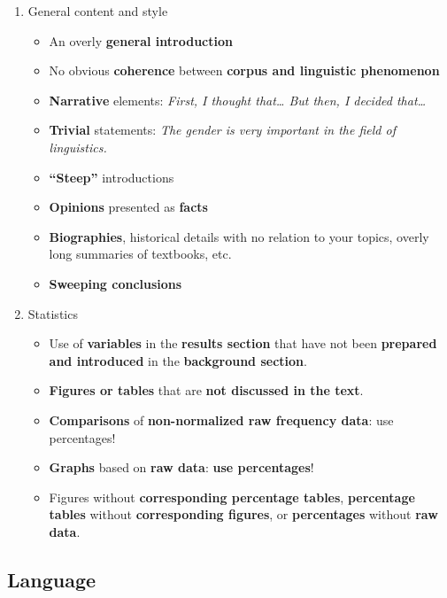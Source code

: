 \documentclass[
  11pt,
  letterpaper,
  DIV=11,
  numbers=noendperiod]{scrreprt}
\providecommand{\tightlist}{%
  \setlength{\itemsep}{0pt}\setlength{\parskip}{0pt}}\usepackage{longtable,booktabs,array}
\begin{document}
\begin{enumerate}
\def\labelenumi{\arabic{enumi}.}
\tightlist
\item
  General content and style

  \begin{itemize}
  \tightlist
  \item
    An overly \textbf{general introduction}
  \item
    No obvious \textbf{coherence} between \textbf{corpus and linguistic
    phenomenon}
  \item
    \textbf{Narrative} elements: \emph{First, I thought that\ldots{} But
    then, I decided that\ldots{}}
  \item
    \textbf{Trivial} statements: \emph{The gender is very important in
    the field of linguistics.}
  \item
    \textbf{``Steep''} introductions
  \item
    \textbf{Opinions} presented as \textbf{facts}
  \item
    \textbf{Biographies}, historical details with no relation to your
    topics, overly long summaries of textbooks, etc.
  \item
    \textbf{Sweeping conclusions}
  \end{itemize}
\item
  Statistics

  \begin{itemize}
  \item
    Use of \textbf{variables} in the \textbf{results section} that have
    not been \textbf{prepared and introduced} in the \textbf{background
    section}.
  \item
    \textbf{Figures or tables} that are \textbf{not discussed in the
    text}.
  \item
    \textbf{Comparisons} of \textbf{non-normalized raw frequency data}:
    use percentages!
  \item
    \textbf{Graphs} based on \textbf{raw data}: \textbf{use
    percentages}!
  \item
    Figures without \textbf{corresponding percentage tables},
    \textbf{percentage tables} without \textbf{corresponding figures},
    or \textbf{percentages} without \textbf{raw data}.
  \end{itemize}
\end{enumerate}

\subsection{Language}\label{language}
\end{document}
